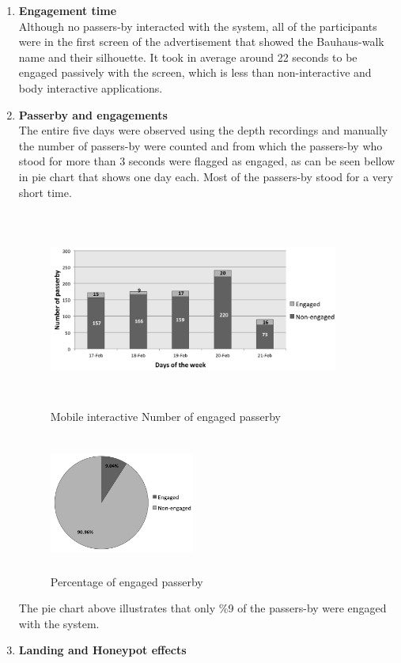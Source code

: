 \begin{enumerate}
\newpage
\item \textbf{Engagement time} \\
Although no passers-by interacted with the system, all of the participants were in the first screen of the advertisement that showed the Bauhaus-walk name and their silhouette. It took in average around 22 seconds to be engaged passively with the screen, which is less than non-interactive and body interactive applications. 


\item \textbf{Passerby and engagements} \\
The entire five days were observed using the depth recordings and manually the number of passers-by were counted and from which the passers-by who stood for more than 3 seconds were flagged as engaged, as can be seen bellow in pie chart that shows one day each. Most of the passers-by stood for a very short time. 

\begin{figure}[H]
    \centering
    \includegraphics[width=0.9\textwidth,height=6.5cm]{Figures/8/mobile_inter_findings/mobile_inter_engage_day}
    \caption{Mobile interactive Number of engaged passerby}%
    \label{fig:mobileengagedandengagedby}%
\end{figure}


\begin{figure}[H]
    \centering
    \includegraphics[width=0.45\textwidth,height=4.5cm]{Figures/8/mobile_inter_findings/mobile_eng_percentage}
    \caption{Percentage of engaged passerby}%
    \label{fig:mobileengagedpasserbypercentage}%
\end{figure}

The pie chart above illustrates that only \%9 of the passers-by were engaged with the system.


\item \textbf{Landing and Honeypot effects}
\end{enumerate}

